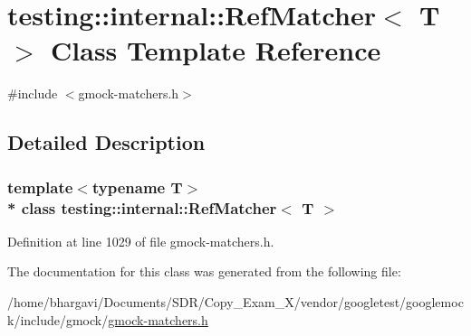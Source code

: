 \hypertarget{classtesting_1_1internal_1_1_ref_matcher}{}\section{testing\+:\+:internal\+:\+:Ref\+Matcher$<$ T $>$ Class Template Reference}
\label{classtesting_1_1internal_1_1_ref_matcher}


{\ttfamily \#include $<$gmock-\/matchers.\+h$>$}



\subsection{Detailed Description}
\subsubsection*{template$<$typename T$>$\\*
class testing\+::internal\+::\+Ref\+Matcher$<$ T $>$}



Definition at line 1029 of file gmock-\/matchers.\+h.



The documentation for this class was generated from the following file\+:\begin{DoxyCompactItemize}
\item 
/home/bhargavi/\+Documents/\+S\+D\+R/\+Copy\+\_\+\+Exam\+\_\+X/vendor/googletest/googlemock/include/gmock/\hyperlink{gmock-matchers_8h}{gmock-\/matchers.\+h}\end{DoxyCompactItemize}
